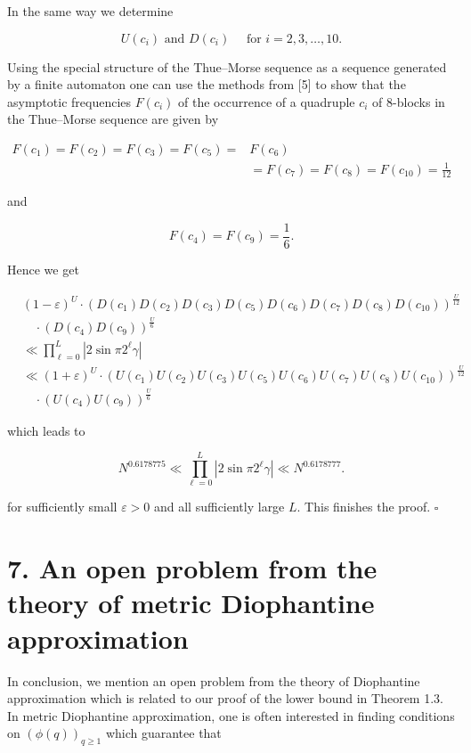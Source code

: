 \documentclass[10pt]{article}
\newcommand{\1}{\mathbf{1}}
\begin{document}
In the same way we determine

$$
U(c_i)\text{ and }D(c_i) \quad \text{ for } i=2,3, \ldots, 10 .
$$

Using the special structure of the Thue--Morse sequence as a sequence generated by a finite automaton one can use the methods from [5] to show that the asymptotic frequencies $F\left(c_{i}\right)$ of the occurrence of a quadruple $c_{i}$ of 8-blocks in the Thue--Morse sequence are given by

$$
\begin{aligned}
F\left(c_{1}\right)=F\left(c_{2}\right)=F\left(c_{3}\right)=F\left(c_{5}\right)= & F\left(c_{6}\right) \\
& =F\left(c_{7}\right)=F\left(c_{8}\right)=F\left(c_{10}\right)=\frac{1}{12}
\end{aligned}
$$

and

$$
F\left(c_{4}\right)=F\left(c_{9}\right)=\frac{1}{6} .
$$

Hence we get

$$
\begin{aligned}
& (1-\varepsilon)^U \cdot\left(D\left(c_{1}\right) D\left(c_{2}\right) D\left(c_{3}\right) D\left(c_{5}\right) D\left(c_{6}\right) D\left(c_{7}\right) D\left(c_{8}\right) D\left(c_{10}\right)\right)^{\frac{U}{12}} \\
& \quad \cdot\left(D\left(c_{4}\right) D\left(c_{9}\right)\right)^{\frac{U}{6}} \\
& \ll \prod_{\ell=0}^{L}\left|2 \sin \pi 2^{\ell} \gamma\right| \\
& \ll(1+\varepsilon)^U \cdot\left(U\left(c_{1}\right) U\left(c_{2}\right) U\left(c_{3}\right) U\left(c_{5}\right) U\left(c_{6}\right) U\left(c_{7}\right) U\left(c_{8}\right) U\left(c_{10}\right)\right)^{\frac{U}{12}} \\
& \quad \cdot\left(U\left(c_{4}\right) U\left(c_{9}\right)\right)^{\frac{U}{6}}
\end{aligned}
$$

which leads to

$$
N^{0.6178775} \ll \prod_{\ell=0}^{L}\left|2 \sin \pi 2^{\ell} \gamma\right| \ll N^{0.6178777} .
$$

for sufficiently small $\varepsilon>0$ and all sufficiently large $L$. This finishes the proof. \(\square\)

\section*{7. An open problem from the theory of metric Diophantine approximation}
In conclusion, we mention an open problem from the theory of Diophantine approximation which is related to our proof of the lower bound in Theorem 1.3. In metric Diophantine approximation, one is often interested in finding conditions on $(\phi(q))_{q \geqslant 1}$ which guarantee that
\end{document}
